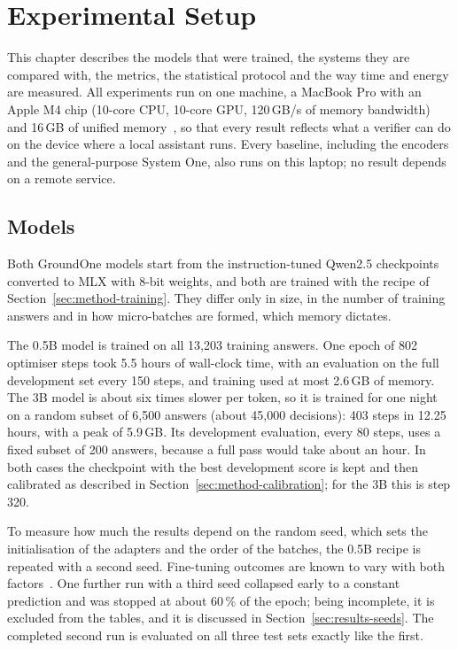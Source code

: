 \chapter{Experimental Setup}
\label{sec:setup}


This chapter describes the models that were trained, the systems they are compared with, the metrics, the statistical
protocol and the way time and energy are measured. All experiments run on one machine, a MacBook Pro with an Apple M4
chip (10-core CPU, 10-core GPU, 120\,GB/s of memory bandwidth) and 16\,GB of unified memory~\cite{apple2024m4specs}, so
that every result reflects what a verifier can do on the device where a local assistant runs. Every baseline, including
the encoders and the general-purpose System One, also runs on this laptop; no result depends on a remote service.

\section{Models}
\label{sec:setup-models}

Both GroundOne models start from the instruction-tuned Qwen2.5 checkpoints~\cite{qwen2024qwen25} converted to MLX with
8-bit weights, and both are trained with the recipe of Section~\ref{sec:method-training}. They differ only in size, in
the number of training answers and in how micro-batches are formed, which memory dictates.

The 0.5B model is trained on all 13{,}203 training answers. One epoch of 802 optimiser steps took 5.5 hours of
wall-clock time, with an evaluation on the full development set every 150 steps, and training used at most 2.6\,GB of
memory. The 3B model is about six times slower per token, so it is trained for one night on a random subset of 6{,}500
answers (about 45{,}000 decisions): 403 steps in 12.25 hours, with a peak of 5.9\,GB. Its development evaluation, every
80 steps, uses a fixed subset of 200 answers, because a full pass would take about an hour. In both cases the checkpoint
with the best development score is kept and then calibrated as described in Section~\ref{sec:method-calibration}; for
the 3B this is step 320.

To measure how much the results depend on the random seed, which sets the initialisation of the adapters and the order
of the batches, the 0.5B recipe is repeated with a second seed. Fine-tuning outcomes are known to vary with both
factors~\cite{dodge2020finetuning}. One further run with a third seed collapsed early to a constant prediction and was
stopped at about 60\,\% of the epoch; being incomplete, it is excluded from the tables, and it is discussed in
Section~\ref{sec:results-seeds}. The completed second run is evaluated on all three test sets exactly like the first.

